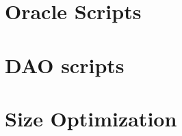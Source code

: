 \documentclass[a4paper,10pt]{article}
\begin{document}
\section{Oracle Scripts}
\section{DAO scripts}



\section{Size Optimization}
\end{document}
